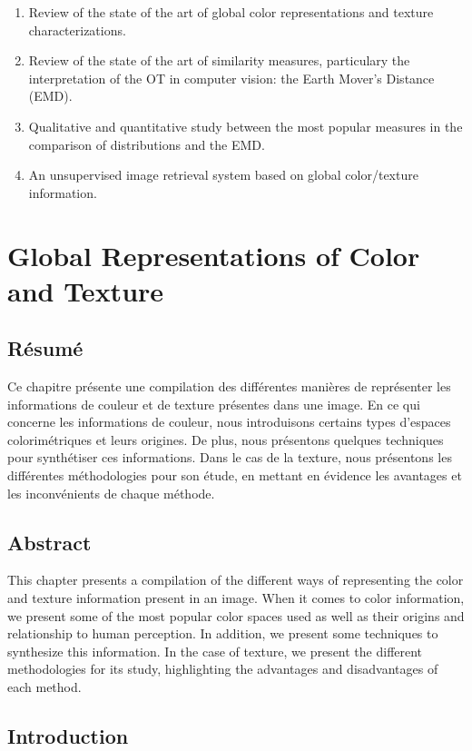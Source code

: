 \begin{enumerate}
	\item Review of the state of the art of global color representations and texture characterizations.
	\item Review of the state of the art of similarity measures, particulary the interpretation of the OT in computer vision: the Earth Mover's Distance (EMD).
	\item Qualitative and quantitative study between the most popular measures in the comparison of distributions and the EMD. 
	\item An unsupervised image retrieval system based on global color/texture information.
\end{enumerate}


\chapter{Global Representations of Color and Texture } \label{ch:color_texure_representations}

\section*{Résumé}
\noindent 
Ce chapitre présente une compilation des différentes manières de représenter les informations de couleur et de texture présentes dans une image. En ce qui concerne les informations de couleur, nous introduisons certains types d'espaces colorimétriques et leurs origines. De plus, nous présentons quelques techniques pour synthétiser ces informations. Dans le cas de la texture, nous présentons les différentes méthodologies pour son étude, en mettant en évidence les avantages et les inconvénients de chaque méthode.
\section*{Abstract}
\noindent 
This chapter presents a compilation of the different ways of representing the color and texture information present in an image. When it comes to color information, we present some of the most popular color spaces used as well as their origins and relationship to human perception. In addition, we present some techniques to synthesize this information. In the case of texture, we present the different methodologies for its study, highlighting the advantages and disadvantages of each method. 

\section{Introduction}

